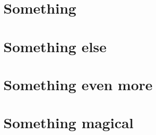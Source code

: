 \documentclass[thesis.tex]{subfiles}
\begin{document}
\section{Something}

\section{Something else}

\section{Something even more}

\section{Something magical}
\end{document}
